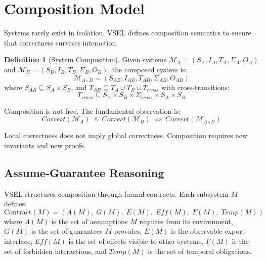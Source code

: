 \documentclass[11pt,a4paper]{article}
\theoremstyle{definition}
\newtheorem{definition}{Definition}[section]
\begin{document}
\section{Composition Model}
\label{sec:composition}

Systems rarely exist in isolation. VSEL defines composition semantics to ensure that correctness survives interaction.

\begin{definition}[System Composition]
\label{def:system-composition}
Given systems $\mathcal{M}_A = (S_A, I_A, T_A, \Sigma_A, O_A)$ and $\mathcal{M}_B = (S_B, I_B, T_B, \Sigma_B, O_B)$, the composed system is:
\begin{equation}
\mathcal{M}_{A \circ B} = (S_{AB}, I_{AB}, T_{AB}, \Sigma_{AB}, O_{AB})
\end{equation}
where $S_{AB} \subseteq S_A \times S_B$, and $T_{AB} \subseteq T_A \cup T_B \cup T_{\mathit{cross}}$ with cross-transitions:
\begin{equation}
T_{\mathit{cross}} \subseteq S_A \times S_B \times \Sigma_{\mathit{cross}} \times S_A \times S_B
\end{equation}
\end{definition}

Composition is not free. The fundamental observation is:
\begin{equation}
\mathit{Correct}(\mathcal{M}_A) \;\land\; \mathit{Correct}(\mathcal{M}_B) \;\not\Rightarrow\; \mathit{Correct}(\mathcal{M}_{A \circ B})
\end{equation}

Local correctness does not imply global correctness. Composition requires new invariants and new proofs.

\subsection{Assume-Guarantee Reasoning}
\label{subsec:assume-guarantee}

VSEL structures composition through formal contracts. Each subsystem $M$ defines:
\begin{equation}
\mathrm{Contract}(M) = (A(M),\; G(M),\; E(M),\; \mathit{Eff}(M),\; F(M),\; \mathit{Temp}(M))
\end{equation}
where $A(M)$ is the set of assumptions $M$ requires from its environment, $G(M)$ is the set of guarantees $M$ provides, $E(M)$ is the observable export interface, $\mathit{Eff}(M)$ is the set of effects visible to other systems, $F(M)$ is the set of forbidden interactions, and $\mathit{Temp}(M)$ is the set of temporal obligations.
\end{document}
